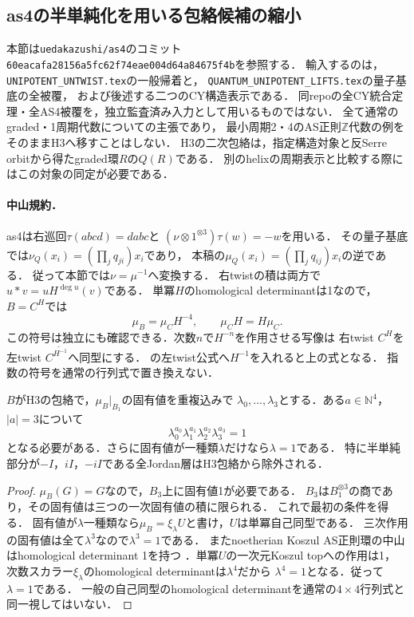 \subsection{as4の半単純化を用いる包絡候補の縮小}
\label{sec:as4-h3-reductions}
本節は\texttt{uedakazushi/as4}のコミット
\texttt{60eacafa28156a5fc62f74eae004d64a84675f4b}を参照する．
輸入するのは，\texttt{UNIPOTENT\_UNTWIST.tex}の一般帰着と，
\texttt{QUANTUM\_UNIPOTENT\_LIFTS.tex}の量子基底の全被覆，
および後述する二つのCY構造表示である\cite{AS4pinned}．
同repoの全CY統合定理・全AS4被覆を，独立監査済み入力として用いるものではない．
全て通常のgraded・1周期代数についての主張であり，
最小周期2・4のAS正則$\mathbb Z$代数の例をそのままH3へ移すことはしない．
H3の二次包絡は，指定構造対象と反Serre orbitから得たgraded環$R$の$Q(R)$である．
別のhelixの周期表示と比較する際にはこの対象の同定が必要である．

\paragraph{中山規約．}
as4は右巡回$\tau(abcd)=dabc$と
$(\nu\otimes1^{\otimes3})\tau(w)=-w$を用いる．
その量子基底では$\nu_Q(x_i)=(\prod_jq_{ji})x_i$であり，
本稿の$\mu_Q(x_i)=(\prod_jq_{ij})x_i$の逆である．
従って本節では$\nu=\mu^{-1}$へ変換する．
右twistの積は両方で$u*v=uH^{\deg u}(v)$である．
単冪$H$のhomological determinantは1なので，
$B=C^H$では
\[
 \mu_B=\mu_CH^{-4},\qquad \mu_C H=H\mu_C.
\]
この符号は独立にも確認できる．次数$n$で$H^{-n}$を作用させる写像は
右twist $C^H$を左twist $C^{\widetilde{H^{-1}}}$へ同型にする．
\cite[Theorem 0.3]{RRZ}の左twist公式へ$H^{-1}$を入れると上の式となる．
指数の符号を通常の行列式で置き換えない．

\begin{proposition}[H3包絡のスペクトル必要条件]
\label{prop:h3-spectral-filter}
$B$がH3の包絡で，$\mu_B|_{B_1}$の固有値を重複込みで
$\lambda_0,\ldots,\lambda_3$とする．ある$a\in\mathbb N^4$，$|a|=3$について
\[
 \lambda_0^{a_0}\lambda_1^{a_1}\lambda_2^{a_2}\lambda_3^{a_3}=1
\]
となる必要がある．さらに固有値が一種類$\lambda$だけなら$\lambda=1$である．
特に半単純部分が$-I$，$iI$，$-iI$である全Jordan層はH3包絡から除外される．
\end{proposition}
\begin{proof}
$\mu_B(G)=G$なので，$B_3$上に固有値1が必要である．
$B_3$は$B_1^{\otimes3}$の商であり，その固有値は三つの一次固有値の積に限られる．
これで最初の条件を得る．
固有値が$\lambda$一種類なら$\mu_B=\xi_\lambda U$と書け，$U$は単冪自己同型である．
三次作用の固有値は全て$\lambda^3$なので$\lambda^3=1$である．
またnoetherian Koszul AS正則環の中山はhomological determinant 1を持つ
\cite[Theorem 6.3]{RRZ}．単冪$U$の一次元Koszul topへの作用は1，
次数スカラー$\xi_\lambda$のhomological determinantは$\lambda^4$だから
$\lambda^4=1$となる．従って$\lambda=1$である．
一般の自己同型のhomological determinantを通常の$4\times4$行列式と同一視してはいない．
\end{proof}


